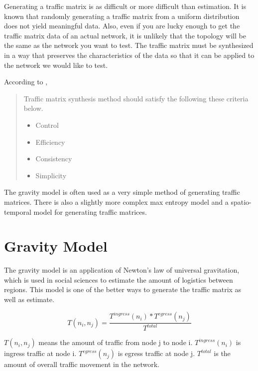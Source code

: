 Generating a traffic matrix is as difficult or more difficult than estimation.
It is known that randomly generating a traffic matrix from a uniform distribution does not yield meaningful data\cite{nucci2005problem}.
Also, even if you are lucky enough to get the traffic matrix data of an actual network, it is unlikely that the topology will be the same as the network you want to test.
The traffic matrix must be synthesized in a way that preserves the characteristics of the data so that it can be applied to the network we would like to test.

According to \cite{tune2015spatiotemporal},
\begin{quote}
  Traffic matrix synthesis method should satisfy the following these criteria below.
  \begin{itemize}
    \item Control
    \item Efficiency
    \item Consistency
    \item Simplicity
  \end{itemize}
\end{quote}

The gravity model is often used as a very simple method of generating traffic matrices\cite{zhang2003fast}\cite{roughan2005simplifying}.
There is also a slightly more complex max entropy model\cite{tune2014maximum} and a spatio-temporal model\cite{zhang2009spatio}\cite{tune2015spatiotemporal} for generating traffic matrices.


\section{Gravity Model}

The gravity model is an application of Newton's law of universal gravitation, which is used in social sciences to estimate the amount of logistics between regions.\cite{evans1973relationship}
This model is one of the better ways to generate the traffic matrix as well as estimate.


\begin{screen}
    \begin{dfn}
        \begin{equation}
            T(n_i,n_j) = \frac{T^{ingress}(n_i)*T^{egress}(n_j)}{T^{total}}
        \end{equation}
    \end{dfn}
\end{screen}

$T(n_i,n_j)$ means the amount of traffic from node j to node i. 
$T^{ingress}(n_i)$ is ingress traffic at node i.
$T^{egress}(n_j)$ is egress traffic at node j.
$T^{total}$ is the amount of overall traffic movement in the network.
